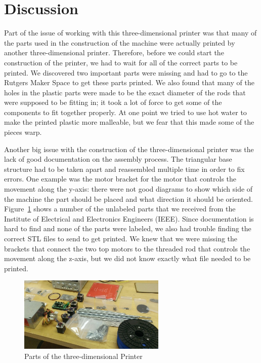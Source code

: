 \documentclass[pdftex,10.5pt]{report}
\begin{document}
\section{Discussion}
Part of the issue of working with this three-dimensional printer was that many of the parts used in the construction of the machine were actually printed by another three-dimensional printer. Therefore, before we could start the construction of the printer, we had to wait for all of the correct parts to be printed. We discovered two important parts were missing and had to go to the Rutgers Maker Space to get these parts printed. We also found that many of the holes in the plastic parts were made to be the exact diameter of the rods that were supposed to be fitting in; it took a lot of force to get some of the components to fit together properly. At one point we tried to use hot water to make the printed plastic more malleable, but we fear that this made some of the pieces warp.

Another big issue with the construction of the three-dimensional printer was the lack of good documentation on the assembly process. The triangular base structure had to be taken apart and reassembled multiple time in order to fix errors. One example was the motor bracket for the motor that controls the movement along the y-axis: there were not good diagrams to show which side of the machine the part should be placed and what direction it should be oriented. Figure~\ref{parts} shows a number of the unlabeled parts that we received from the Institute of Electrical and Electronics Engineers (IEEE). Since documentation is hard to find and none of the parts were labeled, we also had trouble finding the correct STL files to send to get printed. We knew that we were missing the brackets that connect the two top motors to the threaded rod that controls the movement along the z-axis, but we did not know exactly what file needed to be printed.

\begin{figure}[H]
	\centering
	\includegraphics[width=70mm]{figures/WP_20130223_002.jpg}
	\caption{Parts of the three-dimensional Printer}
	\label{parts}
\end{figure}
\end{document}
